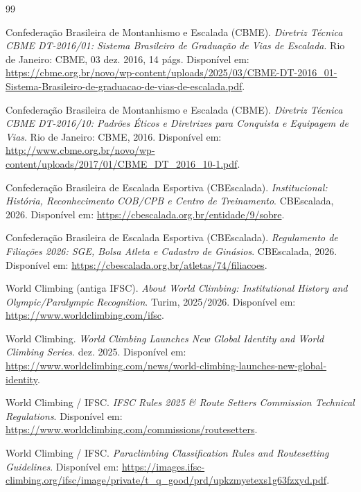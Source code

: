 \begin{thebibliography}{99}

Confederação Brasileira de Montanhismo e Escalada (CBME).
\newblock \textit{Diretriz Técnica CBME DT-2016/01: Sistema Brasileiro de Graduação de Vias de Escalada}.
\newblock Rio de Janeiro: CBME, 03 dez. 2016, 14 págs. Disponível em: \url{https://cbme.org.br/novo/wp-content/uploads/2025/03/CBME-DT-2016_01-Sistema-Brasileiro-de-graduacao-de-vias-de-escalada.pdf}.

Confederação Brasileira de Montanhismo e Escalada (CBME).
\newblock \textit{Diretriz Técnica CBME DT-2016/10: Padrões Éticos e Diretrizes para Conquista e Equipagem de Vias}.
\newblock Rio de Janeiro: CBME, 2016. Disponível em: \url{http://www.cbme.org.br/novo/wp-content/uploads/2017/01/CBME_DT_2016_10-1.pdf}.

Confederação Brasileira de Escalada Esportiva (CBEscalada).
\newblock \textit{Institucional: História, Reconhecimento COB/CPB e Centro de Treinamento}.
\newblock CBEscalada, 2026. Disponível em: \url{https://cbescalada.org.br/entidade/9/sobre}.

Confederação Brasileira de Escalada Esportiva (CBEscalada).
\newblock \textit{Regulamento de Filiações 2026: SGE, Bolsa Atleta e Cadastro de Ginásios}.
\newblock CBEscalada, 2026. Disponível em: \url{https://cbescalada.org.br/atletas/74/filiacoes}.

World Climbing (antiga IFSC).
\newblock \textit{About World Climbing: Institutional History and Olympic/Paralympic Recognition}.
\newblock Turim, 2025/2026. Disponível em: \url{https://www.worldclimbing.com/ifsc}.

World Climbing.
\newblock \textit{World Climbing Launches New Global Identity and World Climbing Series}.
 dez. 2025. Disponível em: \url{https://www.worldclimbing.com/news/world-climbing-launches-new-global-identity}.

World Climbing / IFSC.
\newblock \textit{IFSC Rules 2025 \& Route Setters Commission Technical Regulations}.
\newblock Disponível em: \url{https://www.worldclimbing.com/commissions/routesetters}.

World Climbing / IFSC.
\newblock \textit{Paraclimbing Classification Rules and Routesetting Guidelines}.
\newblock Disponível em: \url{https://images.ifsc-climbing.org/ifsc/image/private/t_q_good/prd/upkzmyetexs1g63fzxyd.pdf}.


\end{thebibliography}
